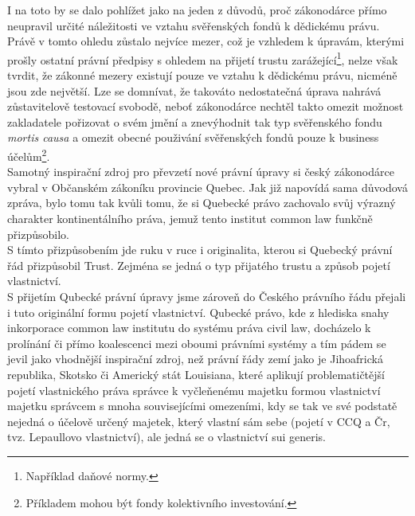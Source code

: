 \documentclass{article}
\begin{document}

I na toto by se dalo pohlížet jako na jeden z důvodů, proč zákonodárce přímo neupravil určité náležitosti ve vztahu svěřenských fondů k dědickému právu. Právě v tomto ohledu zůstalo nejvíce mezer, což je vzhledem k úpravám, kterými prošly ostatní právní předpisy s ohledem na přijetí trustu zarážející\footnote{Například daňové normy.}, nelze však tvrdit, že zákonné mezery existují pouze ve vztahu k dědickému právu, nicméně jsou zde největší. Lze se domnívat, že takováto nedostatečná úprava nahrává zůstavitelově testovací svobodě, neboť zákonodárce nechtěl takto omezit možnost zakladatele pořizovat o svém jmění a znevýhodnit tak typ svěřenského fondu \textit{mortis causa} a omezit obecné použivání svěřenských fondů pouze k business účelům\footnote{Příkladem mohou být fondy kolektivního investování.}.\\

Samotný inspirační zdroj pro převzetí nové právní úpravy si český zákonodárce vybral v Občanském zákoníku provincie Quebec. Jak již napovídá sama důvodová zpráva, bylo tomu tak kvůli tomu, že si Quebecké právo zachovalo svůj výrazný charakter kontinentálního práva, jemuž tento institut common law funkčně přizpůsobilo.\\

S tímto přizpůsobením jde ruku v ruce i originalita, kterou si Quebecký právní řád přizpůsobil Trust. Zejména se jedná o typ přijatého trustu a způsob pojetí vlastnictví.\\

S přijetím Qubecké právní úpravy jsme zároveň do Českého právního řádu přejali i tuto originální formu pojetí vlastnictví. Qubecké právo, kde z hlediska snahy inkorporace common law institutu do systému práva civil law, docházelo k prolínání či přímo koalescenci mezi oboumi právními systémy a tím pádem se jevil jako vhodnější inspirační zdroj, než právní řády zemí jako je Jihoafrická republika, Skotsko či Americký stát Louisiana, které aplikují problematičtější pojetí vlastnického práva správce k vyčleňenému majetku formou vlastnictví majetku správcem s mnoha souvisejícími omezeními, kdy se tak ve své podstatě nejedná o účelově určený majetek, který vlastní sám sebe (pojetí v CCQ a Čr, tvz. Lepaullovo vlastnictví), ale jedná se o vlastnictví sui generis.\\
\end{document}
